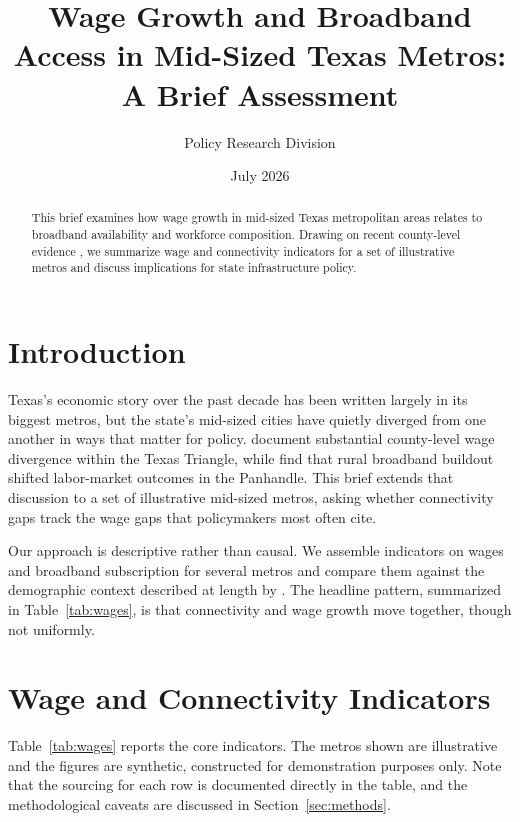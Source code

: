 \documentclass[11pt]{article}
\title{Wage Growth and Broadband Access in Mid-Sized Texas Metros:\\ A Brief Assessment}
\author{Policy Research Division}
\date{July 2026}
\begin{document}
\maketitle

\begin{abstract}
This brief examines how wage growth in mid-sized Texas metropolitan areas
relates to broadband availability and workforce composition. Drawing on
recent county-level evidence \citep{delgado2023}, we summarize wage and
connectivity indicators for a set of illustrative metros and discuss
implications for state infrastructure policy.
\end{abstract}

\section{Introduction}
\label{sec:intro}

Texas's economic story over the past decade has been written largely in its
biggest metros, but the state's mid-sized cities have quietly diverged from
one another in ways that matter for policy. \citet{delgado2023} document
substantial county-level wage divergence within the Texas Triangle, while
\citet{okafor2024} find that rural broadband buildout shifted labor-market
outcomes in the Panhandle. This brief extends that discussion to a set of
illustrative mid-sized metros, asking whether connectivity gaps track the
wage gaps that policymakers most often cite.

Our approach is descriptive rather than causal. We assemble indicators on
wages and broadband subscription for several metros and compare them against
the demographic context described at length by \citet{hemphill2021}. The
headline pattern, summarized in Table~\ref{tab:wages}, is that connectivity
and wage growth move together, though not uniformly.

\section{Wage and Connectivity Indicators}
\label{sec:indicators}

Table~\ref{tab:wages} reports the core indicators. The metros shown are
illustrative and the figures are synthetic, constructed for demonstration
purposes only. Note that the sourcing for each row is documented directly in
the table, and the methodological caveats are discussed in
Section~\ref{sec:methods}.
\end{document}
